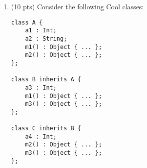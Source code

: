 \documentclass[10pt]{article}
\begin{document}
\begin{enumerate}

\item (10 pts)
Consider the following Cool classes:

\begin{center}
\begin{minipage}{6cm}
\begin{verbatim}
class A {
    a1 : Int;
    a2 : String;
    m1() : Object { ... };
    m2() : Object { ... };
};

class B inherits A {
    a3 : Int;
    m1() : Object { ... };
    m3() : Object { ... };
};

class C inherits B {
    a4 : Int;
    m2() : Object { ... };
    m3() : Object { ... };
};
\end{verbatim}
\end{minipage}
\end{center}
\begin{enumerate}


\end{enumerate}
\end{enumerate}
\end{document}
